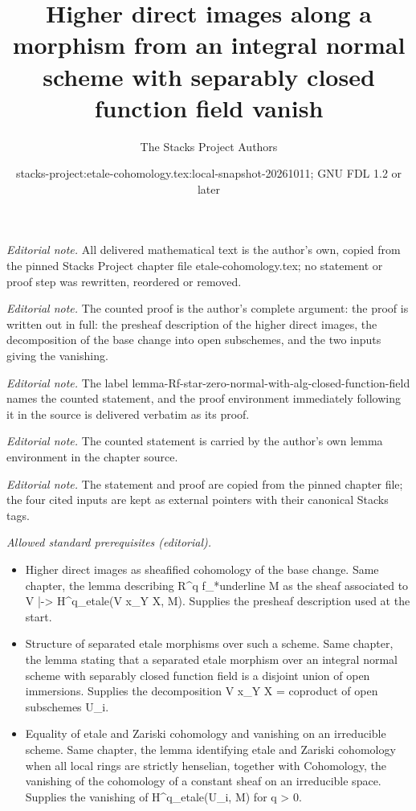 \documentclass[10pt,a4paper]{amsart}
\title{Higher direct images along a morphism from an integral normal scheme with separably closed function field vanish}
\author{The Stacks Project Authors}
\date{stacks-project:etale-cohomology.tex:local-snapshot-20261011; GNU FDL 1.2 or later}
\theoremstyle{plain}
\theoremstyle{definition}
\theoremstyle{remark}
\numberwithin{equation}{subsection}
\begin{document}
\maketitle
\noindent\textit{Editorial note.} All delivered mathematical text is the author's own, copied from the pinned Stacks Project chapter file etale-cohomology.tex; no statement or proof step was rewritten, reordered or removed.\par\medskip
\noindent\textit{Editorial note.} The counted proof is the author's complete argument: the proof is written out in full: the presheaf description of the higher direct images, the decomposition of the base change into open subschemes, and the two inputs giving the vanishing.\par\medskip
\noindent\textit{Editorial note.} The label lemma-Rf-star-zero-normal-with-alg-closed-function-field names the counted statement, and the proof environment immediately following it in the source is delivered verbatim as its proof.\par\medskip
\noindent\textit{Editorial note.} The counted statement is carried by the author's own lemma environment in the chapter source.\par\medskip
\noindent\textit{Editorial note.} The statement and proof are copied from the pinned chapter file; the four cited inputs are kept as external pointers with their canonical Stacks tags.\par\medskip
\noindent\textit{Allowed standard prerequisites (editorial).}\begin{itemize}
\item Higher direct images as sheafified cohomology of the base change. Same chapter, the lemma describing R\textasciicircum{}q f\_*underline M as the sheaf associated to V |-> H\textasciicircum{}q\_etale(V x\_Y X, M). Supplies the presheaf description used at the start.
\item Structure of separated etale morphisms over such a scheme. Same chapter, the lemma stating that a separated etale morphism over an integral normal scheme with separably closed function field is a disjoint union of open immersions. Supplies the decomposition V x\_Y X = coproduct of open subschemes U\_i.
\item Equality of etale and Zariski cohomology and vanishing on an irreducible scheme. Same chapter, the lemma identifying etale and Zariski cohomology when all local rings are strictly henselian, together with Cohomology, the vanishing of the cohomology of a constant sheaf on an irreducible space. Supplies the vanishing of H\textasciicircum{}q\_etale(U\_i, M) for q > 0.
\end{itemize}\medskip
\end{document}
